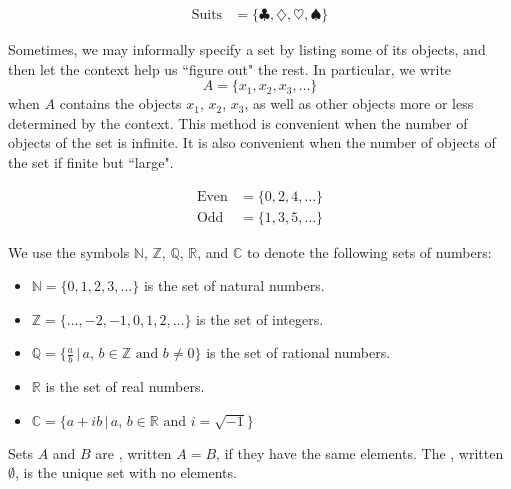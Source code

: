 \begin{eg}
\begin{align*}
\text{Suits} & = \{\clubsuit, \diamondsuit, \heartsuit, \spadesuit \}
\end{align*}
\end{eg}
%
%
Sometimes, we may informally specify a set by listing some of its objects, and
then let the context help us ``figure out" the rest. In particular, we write
\[
A = \{x_1, x_2, x_3, \ldots\}
\]
when $A$ contains the objects $x_1$, $x_2$, $x_3$, as well as other objects more or less
determined by the context.
This method is convenient when the number of objects of the set is infinite.
It is also convenient when the number of objects of the set if finite but ``large".

\begin{eg}
\begin{align*}
\text{Even} & = \{0, 2, 4, \ldots\}\\
\text{Odd} & = \{1, 3, 5, \ldots\}
\end{align*}
\end{eg}

We use the symbols $\mathbb{N}$, $\mathbb{Z}$, $\mathbb{Q}$, $\mathbb{R}$, and $\mathbb{C}$
to denote the following sets of numbers:
\begin{itemize}
\item $\mathbb{N} = \{0, 1,2,3,\ldots\}$ is the set of natural numbers.
\item $\mathbb{Z} = \{\ldots, -2, -1, 0, 1, 2,\ldots\}$ is the set of integers.
\item $\mathbb{Q} = \{\frac{a}{b}\,\vert\, \text{$a$, $b\in\mathbb{Z}$ and $b\neq0$}\}$ is the set of rational numbers.
\item $\mathbb{R}$ is the set of real numbers.
\item $\mathbb{C} = \{a+ib\,\vert\, \text{$a$, $b\in\mathbb{R}$ and $i=\sqrt{-1}$}\}$
\end{itemize}


\begin{defn}
Sets $A$ and $B$ are , written $A=B$,
if they have the same elements.
The , written $\emptyset$, is the unique set with no elements.
\end{defn}


